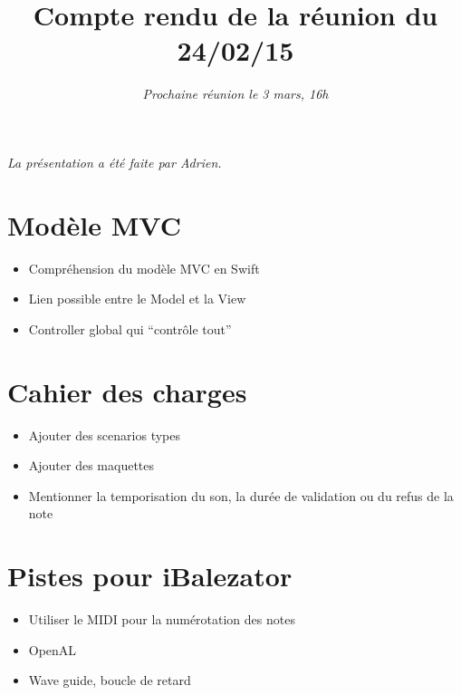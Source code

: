 \documentclass{scrartcl}
\begin{document}

\title{Compte rendu de la réunion du 24/02/15}
\subtitle{\textit{Prochaine réunion le 3 mars, 16h}\vspace{-5ex}}
\date{}
\maketitle

\textit{La présentation a été faite par Adrien.}

\section{Modèle MVC}
\begin{itemize}
 \item Compréhension du modèle MVC en Swift
 \item Lien possible entre le Model et la View
 \item Controller global qui \enquote{contrôle tout}
\end{itemize}


\section{Cahier des charges}
\begin{itemize}
 \item Ajouter des scenarios types
 \item Ajouter des maquettes
 \item Mentionner la temporisation du son, la durée de validation ou du refus de la note
\end{itemize}

\section{Pistes pour iBalezator}
\begin{itemize}
 \item Utiliser le MIDI pour la numérotation des notes
 \item OpenAL
 \item Wave guide, boucle de retard
\end{itemize}
\end{document}
